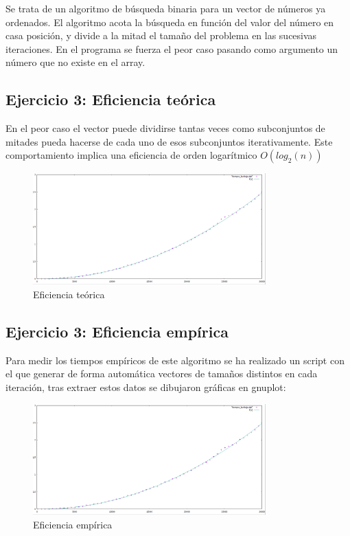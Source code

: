 \documentclass[paper=a4, fontsize=10pt]{scrartcl} %
\begin{document}
Se trata de un algoritmo de búsqueda binaria para un vector de números ya ordenados. El algoritmo acota la búsqueda en función del valor del número en casa posición, y divide a la mitad el tamaño del problema en las sucesivas iteraciones. En el programa se fuerza el peor caso pasando como argumento un número que no existe en el array.

\subsection{Ejercicio 3:  Eficiencia teórica}

En el peor caso el vector puede dividirse tantas veces como subconjuntos de mitades pueda hacerse de cada uno de esos subconjuntos iterativamente. Este comportamiento implica una eficiencia de orden logarítmico  $O(log_2(n))$ %

\begin{figure}[H] %
	\centering
	\label{lsblk}
	\includegraphics[width=0.8\textwidth]{../imgs/c3.PNG}
	\caption{Eficiencia teórica} 
\end{figure}

\subsection{Ejercicio 3:  Eficiencia empírica}

Para medir los tiempos empíricos de este algoritmo se ha realizado un script con el que generar de forma automática vectores de tamaños distintos en cada iteración, tras extraer estos datos se dibujaron gráficas en gnuplot:

\begin{figure}[H] %
	\centering
	\label{lsblk}
	\includegraphics[width=0.8\textwidth]{../imgs/c3.PNG}
	\caption{Eficiencia empírica} 
\end{figure}
\end{document}
